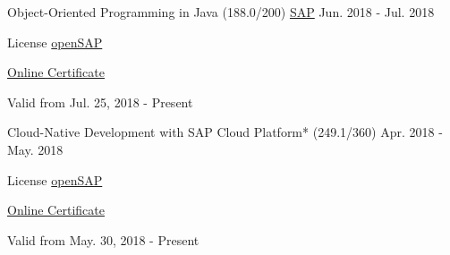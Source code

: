 

\begin{cventries}

  \cventry
    {Object-Oriented Programming in Java (188.0/200)} %
    {\href{https://www.sap.com/index.html}{SAP}} %
    {} %
    {Jun. 2018 - Jul. 2018} %
    {
	    \begin{cvitems} %
        \item {License \href{https://open.sap.com/}{openSAP}} %
        \item {\href{https://open.sap.com/verify/xocis-tyvip-gynuh-byneg-punel}{Online Certificate}} %
        \item {Valid from Jul. 25, 2018 - Present} %
      \end{cvitems}
    }   
    
  \cventry
    {Cloud-Native Development with SAP Cloud Platform* (249.1/360)} %
    {} %
    {} %
    {Apr. 2018 - May. 2018} %
    {
	    \begin{cvitems} %
        \item {License \href{https://open.sap.com/}{openSAP}} %
        \item {\href{https://open.sap.com/verify/xosen-nykel-vybup-susig-sihim}{Online Certificate}} %
        \item {Valid from May. 30, 2018 - Present} %
      \end{cvitems}
    }   


\end{cventries}
